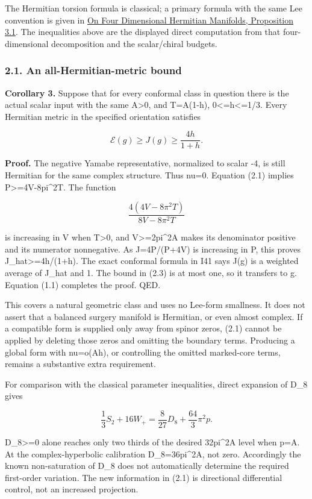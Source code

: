 \documentclass[
  10pt,
]{article}
\begin{document}
The Hermitian torsion formula is classical; a primary formula with the
same Lee convention is given in
\href{https://dergipark.org.tr/tr/download/article-file/2984722}{On Four
Dimensional Hermitian Manifolds, Proposition 3.1}. The inequalities
above are the displayed direct computation from that four-dimensional
decomposition and the scalar/chiral budgets.

\hypertarget{an-all-hermitian-metric-bound}{%
\subsubsection{2.1. An all-Hermitian-metric
bound}\label{an-all-hermitian-metric-bound}}

\textbf{Corollary 3.} Suppose that for every conformal class in question
there is the actual scalar input with the same A\textgreater0, and
T=A(1-h), 0\textless=h\textless=1/3. Every Hermitian metric in the
specified orientation satisfies

\[
 \boxed{\mathcal E(g)\ge J(g)\ge\frac{4h}{1+h}.}     \tag{2.3}
\]

\textbf{Proof.} The negative Yamabe representative, normalized to scalar
-4, is still Hermitian for the same complex structure. Thus nu=0.
Equation (2.1) implies P\textgreater=4V-8pi\^{}2T. The function

\[
 \frac{4(4V-8\pi^2T)}{8V-8\pi^2T}
\]

is increasing in V when T\textgreater0, and V\textgreater=2pi\^{}2A
makes its denominator positive and its numerator nonnegative. As
J=4P/(P+4V) is increasing in P, this proves J\_hat\textgreater=4h/(1+h).
The exact conformal formula in I41 says J(g) is a weighted average of
J\_hat and 1. The bound in (2.3) is at most one, so it transfers to g.
Equation (1.1) completes the proof. QED.

This covers a natural geometric class and uses no Lee-form smallness. It
does not assert that a balanced surgery manifold is Hermitian, or even
almost complex. If a compatible form is supplied only away from spinor
zeros, (2.1) cannot be applied by deleting those zeros and omitting the
boundary terms. Producing a global form with nu=o(Ah), or controlling
the omitted marked-core terms, remains a substantive extra requirement.

For comparison with the classical parameter inequalities, direct
expansion of D\_8 gives

\[
 \frac13S_2+16W_+=\frac8{27}D_8+\frac{64}{3}\pi^2p.  \tag{2.4}
\]

D\_8\textgreater=0 alone reaches only two thirds of the desired
32pi\^{}2A level when p=A. At the complex-hyperbolic calibration
D\_8=36pi\^{}2A, not zero. Accordingly the known non-saturation of D\_8
does not automatically determine the required first-order variation. The
new information in (2.1) is directional differential control, not an
increased projection.
\end{document}
